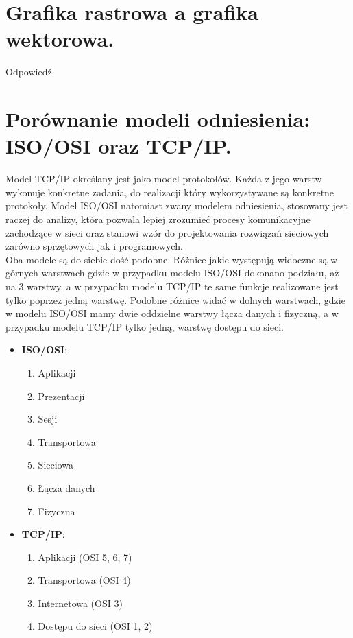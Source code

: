 \documentclass[12pt,a4paper]{article}
\begin{document}
	\section{Grafika rastrowa a grafika wektorowa.}
	Odpowiedź

	\section{Porównanie modeli odniesienia: ISO/OSI oraz TCP/IP.}
	Model TCP/IP określany jest jako model protokołów. Każda z jego warstw wykonuje konkretne zadania, do realizacji który wykorzystywane są konkretne protokoły. Model ISO/OSI natomiast zwany modelem odniesienia, stosowany jest raczej do analizy, która pozwala lepiej zrozumieć procesy komunikacyjne zachodzące w sieci oraz stanowi wzór do projektowania rozwiązań sieciowych zarówno sprzętowych jak i programowych.\\
	Oba modele są do siebie dość podobne. Różnice jakie występują widoczne są w górnych warstwach gdzie w przypadku modelu ISO/OSI dokonano podziału, aż na 3 warstwy, a w przypadku modelu TCP/IP te same funkcje realizowane jest tylko poprzez jedną warstwę. Podobne różnice widać w dolnych warstwach, gdzie w modelu ISO/OSI mamy dwie oddzielne warstwy łącza danych i fizyczną, a w przypadku modelu TCP/IP tylko jedną, warstwę dostępu do sieci.
	
	\begin{multicols}{2}
		\begin{itemize}
			\item \textbf{ISO/OSI}:
			\begin{enumerate}
				\item Aplikacji
				\item Prezentacji
				\item Sesji
				\item Transportowa
				\item Sieciowa
				\item Łącza danych
				\item Fizyczna	
			\end{enumerate}
		
			\columnbreak
			
			\item \textbf{TCP/IP}:
			\begin{enumerate}
				\item Aplikacji (OSI 5, 6, 7)
				\item Transportowa (OSI 4)
				\item Internetowa (OSI 3)
				\item Dostępu do sieci (OSI 1, 2)
			\end{enumerate}
		
			\vfill\null
		\end{itemize}
	\end{multicols}
	
\end{document}
